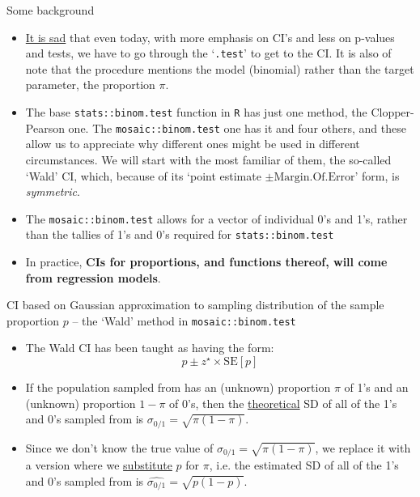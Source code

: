 \documentclass[handout]{beamer}\usepackage[]{graphicx}\usepackage[]{color}
\begin{document}
\begin{frame}{Some background}
\small

\begin{itemize}
	\item \underline{It is sad} that even today, with more emphasis on CI's and less on p-values and tests, we have to go through the `\texttt{.test}' to get to the CI. It is also of note that the procedure mentions the model (binomial) rather than the target parameter, the proportion $\pi.$ \pause
	
	\item The base \texttt{stats::binom.test} function in \texttt{R} has just one method, the Clopper-Pearson one. The \texttt{mosaic::binom.test} one has it and four others, and these allow us to appreciate why different ones might be used in different circumstances. We will start with the most familiar of them, the so-called `Wald' CI, which, because of its `point estimate $\pm \textrm{Margin.Of.Error}$' form, is \textit{symmetric}. \pause 
	
	\item The \texttt{mosaic::binom.test} allows for a vector of individual 0's and 1's, rather than the tallies of 1's and 0's required for \texttt{stats::binom.test} \pause 
	
	\item In practice, \textbf{CIs for proportions, and functions thereof, will come from regression models}. 
	
\end{itemize}
\end{frame}


\begin{frame}{CI based on Gaussian approximation to sampling distribution of the sample proportion $p$ -- the `Wald' method in \texttt{mosaic::binom.test}}
\small
\begin{itemize}
	\item The Wald CI has been taught as having the form: $$p \pm z^\star \times \textrm{SE}[p]$$ \pause
\item If the population sampled from has an (unknown) proportion $\pi$ of 1's
and an (unknown) proportion $1-\pi$ of 0's, then the \underline{theoretical} SD of all of the 1's and 0's sampled from is $\sigma_{0/1} = \sqrt{\pi(1-\pi)}$. \pause
\item Since we don't know the true value of $\sigma_{0/1} = \sqrt{\pi(1-\pi)}$, we replace it with a version where we \underline{substitute} $p$ for $\pi$, i.e. the estimated SD of all of the 1's and 0's sampled from is $\widehat{\sigma_{0/1}} = \sqrt{p(1-p)}$.

\end{itemize}

\end{frame}
\end{document}
